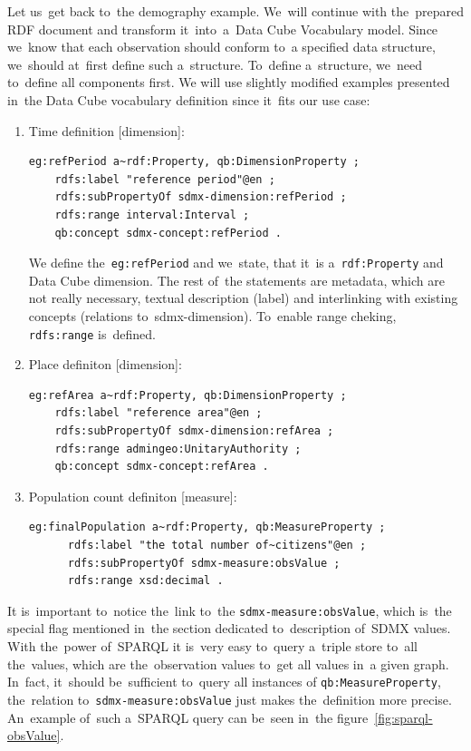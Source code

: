 Let us~get back to~the demography example. We~will continue with the~prepared RDF
document and transform it~into~a~Data Cube Vocabulary model. Since we~know that each
observation should conform to~a specified data structure, we~should at~first define
such a~structure. To~define a~structure, we~need to~define all components first.
We will use slightly modified examples presented in~the Data Cube vocabulary
definition since it~fits our use case:

\begin{enumerate}
\item Time definition [dimension]:

\begin{verbatim}
eg:refPeriod a~rdf:Property, qb:DimensionProperty ;
    rdfs:label "reference period"@en ;
    rdfs:subPropertyOf sdmx-dimension:refPeriod ;
    rdfs:range interval:Interval ;
    qb:concept sdmx-concept:refPeriod .
\end{verbatim}

We define the~\texttt{eg:refPeriod} and we~state, that it~is a~\texttt{rdf:Property} and Data Cube dimension.
The rest of~the statements are metadata, which are not really necessary, textual description
(label) and interlinking with existing concepts (relations to~sdmx-dimension). To~enable range
cheking, \texttt{rdfs:range} is~defined.

\item Place definiton [dimension]:

\begin{verbatim}
eg:refArea a~rdf:Property, qb:DimensionProperty ;
    rdfs:label "reference area"@en ;
    rdfs:subPropertyOf sdmx-dimension:refArea ;
    rdfs:range admingeo:UnitaryAuthority ;
    qb:concept sdmx-concept:refArea .
\end{verbatim}

\item Population count definiton [measure]:
\begin{verbatim}
eg:finalPopulation a~rdf:Property, qb:MeasureProperty ;
      rdfs:label "the total number of~citizens"@en ;
      rdfs:subPropertyOf sdmx-measure:obsValue ;
      rdfs:range xsd:decimal .
\end{verbatim}
\end{enumerate}

It is~important to~notice the~link to~the \texttt{sdmx-measure:obsValue}, which is~the special flag
mentioned in~the section dedicated to~description of~SDMX values. With the~power of~SPARQL
it is~very easy to~query a~triple store to~all the~values, which are the~observation values to~get
all values in~a given graph. In~fact, it~should be~sufficient to~query all instances of
\texttt{qb:MeasureProperty}, the~relation to~\texttt{sdmx-measure:obsValue} just makes the~definition
more precise. An~example of~such a~SPARQL query can be~seen in~the 
figure~\ref{fig:sparql-obsValue}.

